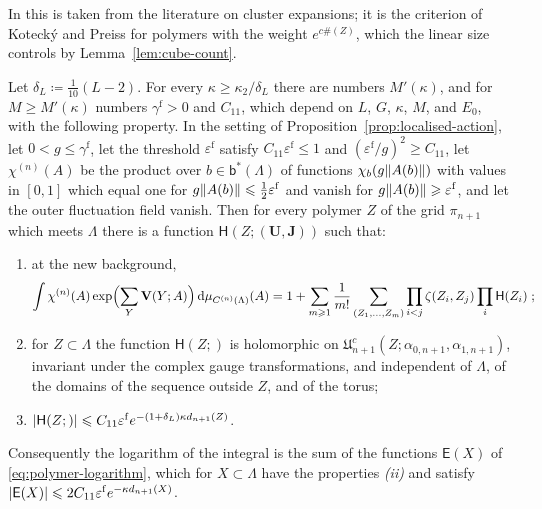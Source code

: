 \documentclass[11pt]{preprint}
\makeatletter
\newcommand{\dd}{\mathrm{d}}
\DeclarePairedDelimiter{\abs}{\lvert}{\rvert}
\DeclarePairedDelimiter{\norm}{\lVert}{\rVert}
\newcommand*{\bigcdot}{}%
\DeclareRobustCommand*{\bigcdot}{%
	\mathbin{\mathpalette\bigcdot@{}}%
}
\newcommand*{\bigcdot@scalefactor}{.7}
\newcommand*{\bigcdot@widthfactor}{1.15}
\newcommand*{\bigcdot@}[2]{%
	\sbox0{$#1\vcenter{}$}%
	\sbox2{$#1\cdot\m@th$}%
	\hbox to \bigcdot@widthfactor\wd2{%
		\hss
		\raise\ht0\hbox{%
			\scalebox{\bigcdot@scalefactor}{%
				\lower\ht0\hbox{$#1\bullet\m@th$}%
			}%
		}%
		\hss
	}%
}
\numberwithin{equation}{section}
\makeatother
\begin{document}
In \cite[(2.11)--(2.13), (2.39)--(2.41)]{BalabanRG2} this is taken from the literature on cluster expansions; it is the criterion of Koteck\'y and Preiss for polymers with the weight $e^{c\#(Z)}$, which the linear size controls by Lemma~\ref{lem:cube-count}.

\begin{theorem}\label{thm:fluctuation-integral}
Let $\delta_L \coloneqq \frac{1}{10}(L - 2)$. For every $\kappa \geqslant \kappa_2/\delta_L$ there are numbers $M'(\kappa)$, and for $M \geqslant M'(\kappa)$ numbers $\gamma^{\mathrm f} > 0$ and $C_{11}$, which depend on $L$, $G$, $\kappa$, $M$, and $E_0$, with the following property. In the setting of Proposition~\ref{prop:localised-action}, let $0 < g \leqslant \gamma^{\mathrm f}$, let the threshold $\varepsilon^{\mathrm f}$ satisfy $C_{11}\varepsilon^{\mathrm f} \leqslant 1$ and $(\varepsilon^{\mathrm f}/g)^2 \geqslant C_{11}$, let $\chi^{(n)}(A)$ be the product over $b \in \mathsf b^*(\Lambda)$ of functions $\chi_b(g\norm{A(b)})$ with values in $[0, 1]$ which equal one for $g\norm{A(b)} \leqslant \frac{1}{2}\varepsilon^{\mathrm f}$ and vanish for $g\norm{A(b)} \geqslant \varepsilon^{\mathrm f}$, and let the outer fluctuation field vanish. Then for every polymer $Z$ of the grid $\pi_{n+1}$ which meets $\Lambda$ there is a function $\mathsf H(Z; (\mathbf U, \mathbf J))$ such that:
\begin{enumerate}[label=(\roman*)]
\item at the new background,
\begin{equation}\label{eq:fluctuation-polymers}
    \int\chi^{(n)}(A)\exp\Bigl(\sum_Y\mathbf V(Y; A)\Bigr)\,\dd\mu_{C^{(n)}(\Lambda)}(A) = 1 + \sum_{m \geqslant 1}\frac{1}{m!}\sum_{(Z_1, \dots, Z_m)}\prod_{i < j}\zeta(Z_i, Z_j)\prod_i\mathsf H(Z_i)\;;
\end{equation}
\item for $Z \subset \Lambda$ the function $\mathsf H(Z; \bigcdot)$ is holomorphic on $\mathfrak U^c_{n+1}(Z; \alpha_{0,n+1}, \alpha_{1,n+1})$, invariant under the complex gauge transformations, and independent of $\Lambda$, of the domains of the sequence outside $Z$, and of the torus;
\item $\abs{\mathsf H(Z; \bigcdot)} \leqslant C_{11}\varepsilon^{\mathrm f}e^{-(1 + \delta_L)\kappa d_{n+1}(Z)}$.
\end{enumerate}
Consequently the logarithm of the integral is the sum of the functions $\mathsf E(X)$ of \eqref{eq:polymer-logarithm}, which for $X \subset \Lambda$ have the properties \emph{(ii)} and satisfy $\abs{\mathsf E(X)} \leqslant 2C_{11}\varepsilon^{\mathrm f}e^{-\kappa d_{n+1}(X)}$.
\end{theorem}
\end{document}
